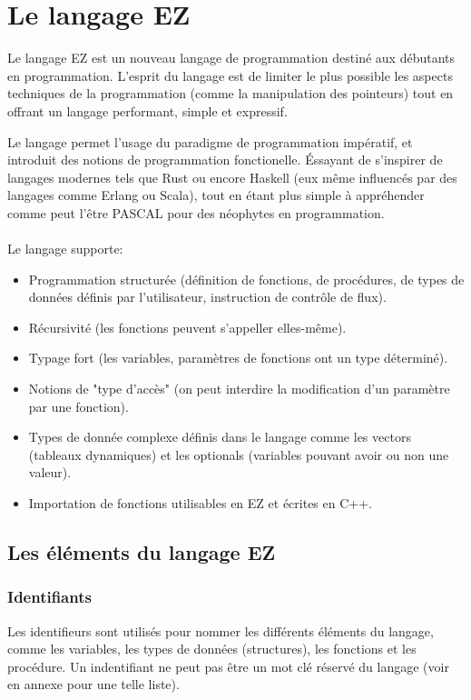 \section{Le langage EZ}

Le langage EZ est un nouveau langage de programmation destiné aux débutants en
programmation.
L'esprit du langage est de limiter le plus possible les aspects techniques de
la programmation (comme la manipulation des pointeurs) tout en offrant un 
langage performant, simple et expressif.

Le langage permet l'usage du paradigme de programmation impératif, et introduit
des notions de programmation fonctionelle. Éssayant de s'inspirer de langages 
modernes tels que Rust ou encore Haskell (eux même influencés par des langages
comme Erlang ou Scala), tout en étant plus simple à appréhender 
comme peut l'être PASCAL pour des néophytes en programmation.

\paragraph{}Le langage supporte:
\begin{itemize}
    \item Programmation structurée (définition de fonctions, de procédures,
          de types de données définis par l'utilisateur, instruction de
          contrôle de flux).
    \item Récursivité (les fonctions peuvent s'appeller elles-même).
    \item Typage fort (les variables, paramètres de fonctions ont un type déterminé).
    \item Notions de "type d'accès" (on peut interdire la modification d'un
          paramètre par une fonction).
    \item Types de donnée complexe définis dans le langage comme les vectors
          (tableaux dynamiques) et les optionals
          (variables pouvant avoir ou non une valeur).
    \item Importation de fonctions utilisables en EZ et écrites en C++.
\end{itemize}

\subsection{Les éléments du langage EZ}

\subsubsection{Identifiants}
Les identifieurs sont utilisés pour nommer les différents éléments du langage,
comme les variables, les types de données (structures), les fonctions et les
procédure. Un indentifiant ne peut pas être un mot clé réservé du langage
(voir en annexe pour une telle liste).

